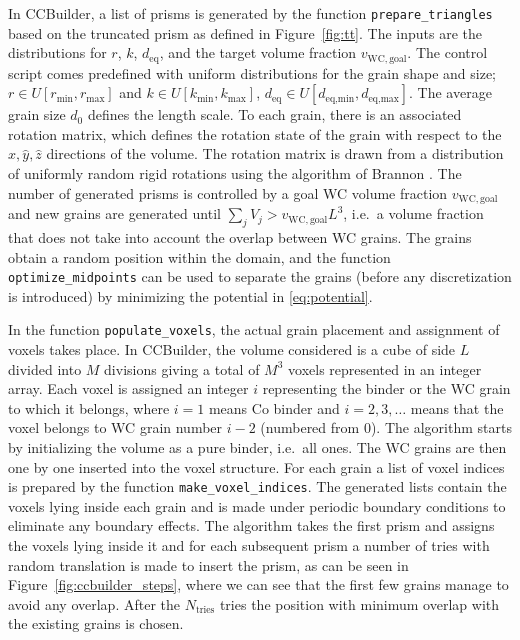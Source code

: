 \documentclass[3p,12pt]{elsarticle}
\newcommand{\WC}{\mathrm{WC}}
\begin{document}
In CCBuilder, a list of prisms is generated by the function \verb|prepare_triangles| based on the truncated prism as defined in Figure~\ref{fig:tt}.
The inputs are the distributions for $r$, $k$, $d_\text{eq}$, and the target volume fraction $v_{\WC,\text{goal}}$.
The control script comes predefined with uniform distributions for the grain shape and size; $r \in U[r_\text{min},r_\text{max}]$ and $k \in U[k_\text{min},k_\text{max}]$, $d_\text{eq} \in U[d_\text{eq,min},d_\text{eq,max}]$.
The average grain size $d_0$ defines the length scale.
%
To each grain, there is an associated rotation matrix, which defines the rotation state of the grain with respect to the $\hat{x}, \hat{y}, \hat{z}$ directions of the volume.
The rotation matrix is drawn from a distribution of uniformly random rigid rotations using the algorithm of Brannon \cite{brannon_rotation:_2002}.
The number of generated prisms is controlled by a goal WC volume fraction $v_{\WC,\text{goal}}$ and new grains are generated until $\sum_j V_j > v_{\WC,\text{goal}}L^3$, i.e.\ a volume fraction that does not take into account the overlap between WC grains.
The grains obtain a random position within the domain, and the function \verb+optimize_midpoints+ can be used to separate the grains (before any discretization is introduced) by minimizing the potential in \eqref{eq:potential}.


In the function \verb|populate_voxels|, the actual grain placement and assignment of voxels takes place.
In CCBuilder, the volume considered is a cube of side $L$ divided into $M$ divisions giving a total of $M^3$ voxels represented in an integer array.
%
Each voxel is assigned an integer $i$ representing the binder or the WC grain to which it belongs, where $i=1$ means Co binder and $i = 2, 3, \ldots$ means that the voxel belongs to WC grain number $i-2$ (numbered from $0$).
The algorithm starts by initializing the volume as a pure binder, i.e.\ all ones.
The WC grains are then one by one inserted into the voxel structure.
For each grain a list of voxel indices is prepared by the function \verb|make_voxel_indices|.
The generated lists contain the voxels lying inside each grain and is made under periodic boundary conditions to eliminate any boundary effects.
%
The algorithm takes the first prism and assigns the voxels lying inside it and for each subsequent prism a number of tries with random translation is made to insert the prism, as can be seen in Figure~\ref{fig:ccbuilder_steps}, where we can see that the first few grains manage to avoid any overlap.
After the $N_\text{tries}$ tries the position with minimum overlap with the existing grains is chosen.
\end{document}
